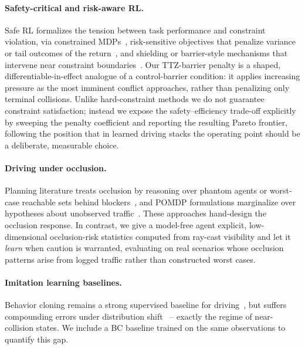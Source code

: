 \documentclass{article}
\begin{document}
\paragraph{Safety-critical and risk-aware RL.}
Safe RL formalizes the tension between task performance and constraint
violation, via constrained MDPs~\citep{altman1999constrained,
achiam2017constrained}, risk-sensitive objectives that penalize variance or
tail outcomes of the return~\citep{garcia2015comprehensive}, and shielding
or barrier-style mechanisms that intervene near constraint
boundaries~\citep{alshiekh2018safe}. Our TTZ-barrier penalty is a shaped,
differentiable-in-effect analogue of a control-barrier condition: it applies
increasing pressure as the most imminent conflict approaches, rather than
penalizing only terminal collisions. Unlike hard-constraint methods we do
not guarantee constraint satisfaction; instead we expose the
safety--efficiency trade-off explicitly by sweeping the penalty coefficient
and reporting the resulting Pareto frontier, following the position that in
learned driving stacks the operating point should be a deliberate,
measurable choice.

\paragraph{Driving under occlusion.}
Planning literature treats occlusion by reasoning over phantom agents or
worst-case reachable sets behind blockers~\citep{orzechowski2018tackling},
and POMDP formulations marginalize over hypotheses about unobserved
traffic~\citep{bouton2018scalable}. These approaches hand-design the
occlusion response. In contrast, we give a model-free agent explicit,
low-dimensional occlusion-risk statistics computed from ray-cast visibility
and let it \emph{learn} when caution is warranted, evaluating on real
scenarios whose occlusion patterns arise from logged traffic rather than
constructed worst cases.

\paragraph{Imitation learning baselines.}
Behavior cloning remains a strong supervised baseline for
driving~\citep{bansal2018chauffeurnet, codevilla2019exploring}, but suffers
compounding errors under distribution shift~\citep{ross2011reduction} --
exactly the regime of near-collision states. We include a BC baseline
trained on the same observations to quantify this gap.
\end{document}
